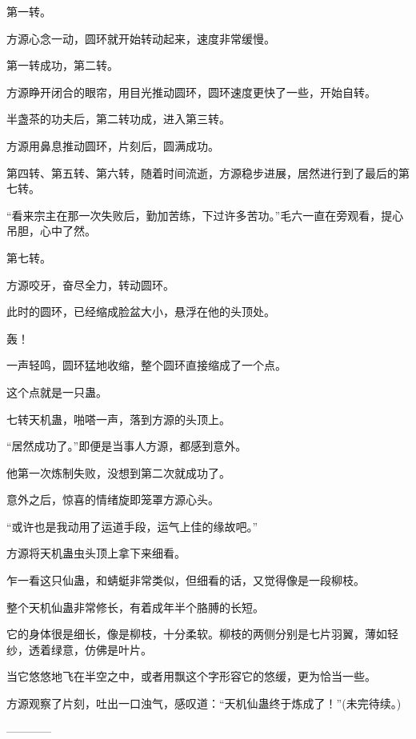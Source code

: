 \begin{this_body}
第一转。

方源心念一动，圆环就开始转动起来，速度非常缓慢。

第一转成功，第二转。

方源睁开闭合的眼帘，用目光推动圆环，圆环速度更快了一些，开始自转。

半盏茶的功夫后，第二转功成，进入第三转。

方源用鼻息推动圆环，片刻后，圆满成功。

第四转、第五转、第六转，随着时间流逝，方源稳步进展，居然进行到了最后的第七转。

“看来宗主在那一次失败后，勤加苦练，下过许多苦功。”毛六一直在旁观看，提心吊胆，心中了然。

第七转。

方源咬牙，奋尽全力，转动圆环。

此时的圆环，已经缩成脸盆大小，悬浮在他的头顶处。

轰！

一声轻鸣，圆环猛地收缩，整个圆环直接缩成了一个点。

这个点就是一只蛊。

七转天机蛊，啪嗒一声，落到方源的头顶上。

“居然成功了。”即便是当事人方源，都感到意外。

他第一次炼制失败，没想到第二次就成功了。

意外之后，惊喜的情绪旋即笼罩方源心头。

“或许也是我动用了运道手段，运气上佳的缘故吧。”

方源将天机蛊虫头顶上拿下来细看。

乍一看这只仙蛊，和蜻蜓非常类似，但细看的话，又觉得像是一段柳枝。

整个天机仙蛊非常修长，有着成年半个胳膊的长短。

它的身体很是细长，像是柳枝，十分柔软。柳枝的两侧分别是七片羽翼，薄如轻纱，透着绿意，仿佛是叶片。

当它悠悠地飞在半空之中，或者用飘这个字形容它的悠缓，更为恰当一些。

方源观察了片刻，吐出一口浊气，感叹道：“天机仙蛊终于炼成了！”(未完待续。)

------------

\end{this_body}

